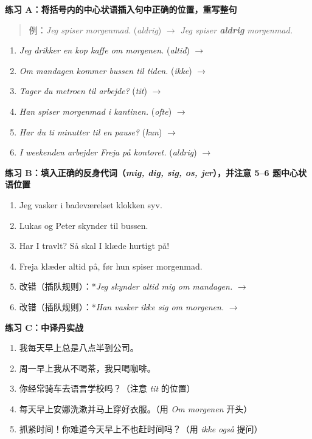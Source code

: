 \textbf{练习 A：将括号内的中心状语插入句中正确的位置，重写整句}
\begin{quote}
\small 例：\textit{Jeg spiser morgenmad.} (\textit{aldrig}) $\rightarrow$ \textit{Jeg spiser \textbf{aldrig} morgenmad.}
\end{quote}
\begin{enumerate}
  \item \textit{Jeg drikker en kop kaffe om morgenen.} (\textit{altid}) $\rightarrow$
  \item \textit{Om mandagen kommer bussen til tiden.} (\textit{ikke}) $\rightarrow$
  \item \textit{Tager du metroen til arbejde?} (\textit{tit}) $\rightarrow$
  \item \textit{Han spiser morgenmad i kantinen.} (\textit{ofte}) $\rightarrow$
  \item \textit{Har du ti minutter til en pause?} (\textit{kun}) $\rightarrow$
  \item \textit{I weekenden arbejder Freja på kontoret.} (\textit{aldrig}) $\rightarrow$
\end{enumerate}

\textbf{练习 B：填入正确的反身代词（\textit{mig, dig, sig, os, jer}），并注意 5--6 题中心状语位置}
\begin{enumerate}
  \item Jeg vasker \underline{\hspace{1.4cm}} i badeværelset klokken syv.
  \item Lukas og Peter skynder \underline{\hspace{1.4cm}} til bussen.
  \item Har I travlt? Så skal I klæde \underline{\hspace{1.4cm}} hurtigt på!
  \item Freja klæder \underline{\hspace{1.4cm}} altid på, før hun spiser morgenmad.
  \item 改错（插队规则）：*\textit{Jeg skynder altid mig om mandagen.} $\rightarrow$
  \item 改错（插队规则）：*\textit{Han vasker ikke sig om morgenen.} $\rightarrow$
\end{enumerate}

\textbf{练习 C：中译丹实战}
\begin{enumerate}
  \item 我每天早上总是八点半到公司。
  \item 周一早上我从不喝茶，我只喝咖啡。
  \item 你经常骑车去语言学校吗？（注意 \textit{tit} 的位置）
  \item 每天早上安娜洗漱并马上穿好衣服。（用 \textit{Om morgenen} 开头）
  \item 抓紧时间！你难道今天早上不也赶时间吗？（用 \textit{ikke også} 提问）
\end{enumerate}

